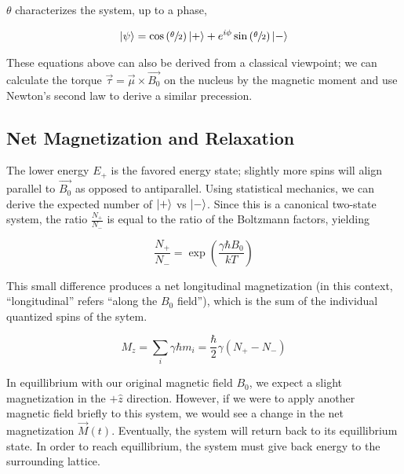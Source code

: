 \documentclass[
    floatfix,  %
    reprint,
    amsmath,
    amssymb,
    aps,
]{revtex4-2}
\DeclarePairedDelimiter\ket{\lvert}{\rangle}
\begin{document}
$\theta$ characterizes the system, up to a phase,

\begin{gather*}
    \ket{\psi} = \cos\left(\sfrac{\theta}{2}\right)\ket{+}+ e^{i\phi}\sin\left(\sfrac{\theta}{2}\right) \ket{-}
\end{gather*}

These equations above can also be derived from a classical viewpoint; we can calculate the torque $\vec{\tau}  =\vec{ \mu }\times \vec{B_0}$ on the nucleus by the magnetic moment and use Newton's second law to derive a similar precession.











\subsection{\label{subsec:pulses} Net Magnetization and Relaxation}

The lower energy $E_+$ is the favored energy state; slightly more spins will align parallel to $\vec{B_0}$ as opposed to antiparallel. Using statistical mechanics, we can derive the expected number of $\ket{+}$ vs $\ket{-}$. Since this is a canonical two-state system, the ratio $\frac{N_+}{N_-}$ is equal to the ratio of the Boltzmann factors, yielding

\begin{equation}
    \frac{N_+}{N_-} = \exp\left(\frac{\gamma \hbar B_0}{k T}\right)
\end{equation}

This small difference produces a net longitudinal magnetization (in this context, ``longitudinal'' refers ``along the $B_0$ field''), which is the sum of the individual quantized spins of the sytem.

\begin{equation}
    M_z = \sum_i \gamma \hbar m_i = \frac{\hbar}{2} \gamma (N_+ - N_-)
\end{equation}

In equillibrium with our original magnetic field $B_0$, we expect a slight magnetization in the $+\hat{z}$ direction. However, if we were to apply another magnetic field briefly to this system, we would see a change in the net magnetization $\vec{M}(t)$. Eventually, the system will return back to its equillibrium state. In order to reach equillibrium, the system must give back energy to the surrounding lattice.
\end{document}
